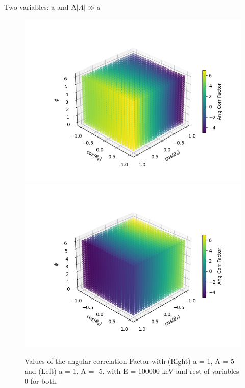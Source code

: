 \documentclass{beamer}
\begin{document}
\begin{frame}{Two variables: a and A}{$|A|\gg a$}
	\begin{figure}
		\centering
		\includegraphics[width=0.4\paperwidth]{plots/posa_xlposA_3D}
		\includegraphics[width=0.4\paperwidth]{plots/posa_xlnegA_3D}
		\caption{Values of the angular correlation Factor with (Right) a = 1, A = 5 and (Left) a = 1, A = -5, with E = 100000 keV and rest of variables 0 for both.}

	\end{figure}
\end{frame}
\end{document}
